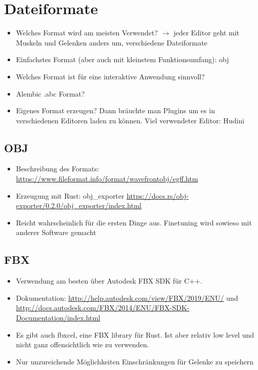 \section{Dateiformate}

\begin{itemize}
 \item Welches Format wird am meisten Verwendet? $\rightarrow$ jeder Editor geht mit Muskeln und Gelenken anders um, verschiedene Dateiformate
 \item Einfachstes Format (aber auch mit kleinstem Funktionsumfang): obj
 \item Welches Format ist für eine interaktive Anwendung sinnvoll?
 \item Alembic .abc Format? %
 \item Eigenes Format erzeugen? Dann bräuchte man Plugins um es in verschiedenen Editoren laden zu können. Viel verwendeter Editor: Hudini
\end{itemize}

\subsection{OBJ}

\begin{itemize}
 \item Beschreibung des Formats: \url{https://www.fileformat.info/format/wavefrontobj/egff.htm}
 \item Erzeugung mit Rust: obj\_exporter \url{https://docs.rs/obj-exporter/0.2.0/obj_exporter/index.html}
 \item Reicht wahrscheinlich für die ersten Dinge aus. Finetuning wird sowieso mit anderer Software gemacht
\end{itemize}

\subsection{FBX}

\begin{itemize}
 \item Verwendung am besten über Autodesk FBX SDK für C++. 
 \item Dokumentation: \url{http://help.autodesk.com/view/FBX/2019/ENU/} und \url{http://docs.autodesk.com/FBX/2014/ENU/FBX-SDK-Documentation/index.html}
 \item Es gibt auch fbxcel, eine FBX library für Rust. Ist aber relativ low level und nicht ganz offensichtlich wie zu verwenden.
 \item Nur unzureichende Möglichkeiten Einschränkungen für Gelenke zu speichern %
\end{itemize}

